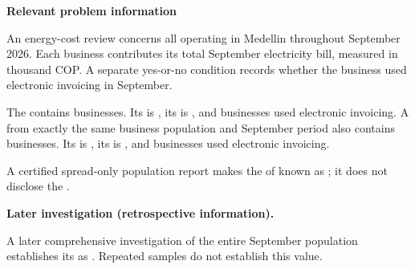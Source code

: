 \clearpage



\textbf{Relevant problem information}

\begin{probleminfoexcerpt}
An energy-cost review concerns all     operating in Medellin throughout September 2026. Each business contributes its total September electricity bill, measured in thousand COP. A separate yes-or-no condition records whether the business used electronic invoicing in September.
\end{probleminfoexcerpt}

\begin{probleminfoexcerpt}
The     contains  businesses. Its   is   , its    is   , and  businesses used electronic invoicing. A     from exactly the same business population and September period also contains  businesses. Its   is   , its    is   , and  businesses used electronic invoicing.
\end{probleminfoexcerpt}

\begin{probleminfoexcerpt}
A certified spread-only population report makes the    of  known as   ; it does not disclose the   .
\end{probleminfoexcerpt}

\textbf{Later investigation (retrospective information).}

\begin{probleminfoexcerpt}
A later comprehensive investigation of the entire September population establishes its   as   . Repeated samples do not establish this value.
\end{probleminfoexcerpt}

